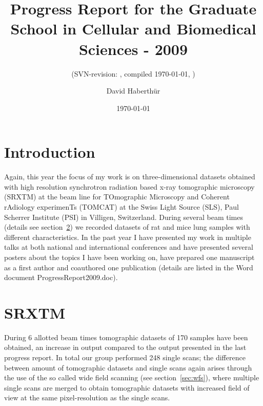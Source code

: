 \documentclass[a4paper,twoside,DIV=calc]{scrartcl}
\title{Progress Report for the Graduate School in Cellular and Biomedical Sciences - 2009}
\subtitle{(SVN-revision: \svnkw{LastChangedRevision}, compiled \today, \thistime)}
\author{David Haberthür}
\date{\today}
\begin{document}
\maketitle

\section{Introduction}
Again, this year the focus of my work is on three-dimensional datasets obtained with high resolution synchrotron radiation based x-ray tomographic microscopy (SRXTM) at the beam line for TOmographic Microscopy and Coherent rAdiology experimenTs (TOMCAT) at the Swiss Light Source (SLS), Paul Scherrer Institute (PSI) in Villigen, Switzerland. During several beam times (details see section~\ref{sec:srxtm}) we recorded datasets of rat and mice lung samples with different characteristics. In the past year I have presented my work in multiple talks at both national and international conferences and have presented several posters about the topics I have been working on, have prepared one manuscript as a first author and coauthored one publication (details are listed in the Word document ProgressReport2009.doc).

\section{SRXTM}\label{sec:srxtm}
During 6 allotted beam times tomographic datasets of 170 samples have been obtained, an increase in output compared to the output presented in the last progress report. In total our group performed 248 single scans; the difference between amount of tomographic datasets and single scans again arises through the use of the so called wide field scanning (see section~\ref{sec:wfs}), where multiple single scans are merged to obtain tomographic datasets with increased field of view at the same pixel-resolution as the single scans.
\end{document}
